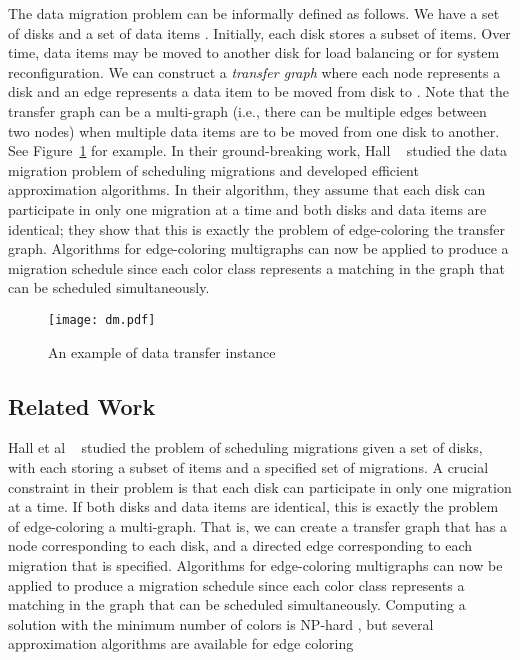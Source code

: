 \documentclass[titlepage, 11pt]{article}
\begin{document}
The data migration problem can be informally defined as follows.
We have a set of disks  and
a set of data items . Initially,
each disk stores a subset of items. Over time, data items
may be moved to another disk for load balancing or for system reconfiguration.
We can construct a \emph{transfer graph}  where 
each node represents a disk and an edge  represents a data item
to be moved from disk  to . 
Note that the transfer graph can be a multi-graph (i.e., there
can be multiple edges between two nodes) when multiple data
items are to be moved from one disk to another.
See Figure~\ref{fig:dm-example} for example.
In their ground-breaking work, Hall ~\cite{Karlin} studied
the data migration problem of scheduling migrations 
and developed efficient approximation algorithms.
In their algorithm, they assume that each disk can participate
in only one migration at a time and  both disks and data items are identical;
they show that this is exactly the problem of edge-coloring the transfer graph. 
Algorithms for edge-coloring multigraphs can now be applied to produce 
a migration schedule since each color class represents a matching 
in the graph that can be scheduled simultaneously.
\begin{figure}[h]
\centering
\texttt{[image: dm.pdf]}
\vspace{0.2in}
\caption{
An example of data transfer instance}
\label{fig:dm-example}
\end{figure}

\subsection{Related Work}
Hall et al ~\cite{Karlin} studied
the problem of scheduling migrations given a set of disks, with each storing a subset of items
and a specified set of migrations. A crucial constraint in their problem is that each disk can participate
in only one migration at a time. If both disks and data items are identical,
this is exactly the problem of edge-coloring a multi-graph.
That is, we can create a transfer graph  that has a node corresponding to each disk, and
a directed edge corresponding to each migration that is specified.
Algorithms for edge-coloring multigraphs can now be applied to produce
a migration schedule since each color class represents a matching
in the graph that can be scheduled simultaneously.
Computing a solution with the minimum number of
colors is \textsf{NP}-hard \cite{holyerNPhard}, but several approximation algorithms
are available for edge coloring
\end{document}
